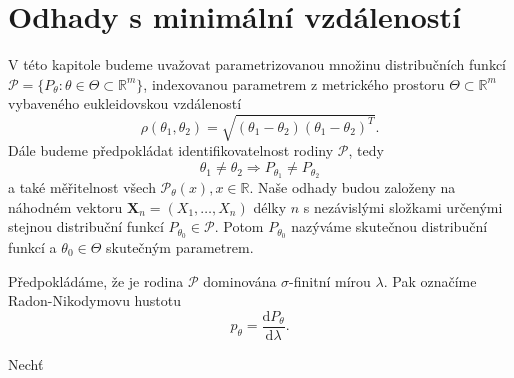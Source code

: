 \chapter{Odhady s minimální vzdáleností}

V této kapitole budeme uvažovat parametrizovanou množinu distribučních funkcí $\mathcal{P} = \lbrace P_\theta : \theta \in \Theta \subset \mathbb{R}^m \rbrace$, indexovanou parametrem z metrického prostoru $\Theta \subset \mathbb{R}^m$ vybaveného eukleidovskou vzdáleností 
\begin{equation}
	\rho (\theta_1,\theta_2) = \sqrt{(\theta_1-\theta_2)(\theta_1-\theta_2)^T}. 
\end{equation}
Dále budeme předpokládat identifikovatelnost rodiny $\mathcal{P}$, tedy 
\begin{equation}
\theta_1 \neq \theta_2 \Rightarrow P_{\theta_1} \neq P_{\theta_2}
\end{equation}
a také měřitelnost všech $\mathcal{P}_\theta(x), x \in \mathbb{R}$. Naše odhady budou založeny na náhodném vektoru $\mathbf{X}_n = (X_1, \ldots ,X_n)$ délky $n$ s nezávislými složkami určenými stejnou distribuční funkcí $P_{\theta_0} \in \mathcal{P}$. Potom $P_{\theta_0}$ nazýváme skutečnou distribuční funkcí a $\theta_0 \in \Theta$ skutečným parametrem. 

Předpokládáme, že je rodina $\mathcal{P}$ dominována $\sigma$-finitní mírou $\lambda$. Pak označíme Radon-Nikodymovu hustotu 
\begin{equation}
p_\theta = \dfrac{\mathrm{d} P_\theta}{\mathrm{d} \lambda}.
\end{equation}

\begin{definition}
	Nech\v{t} 
\end{definition}